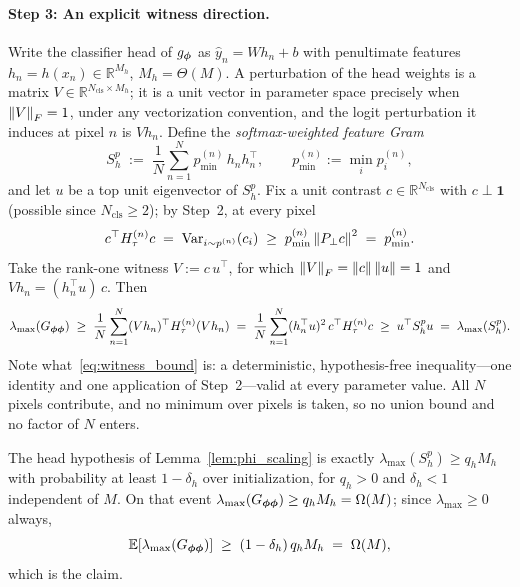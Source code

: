 \paragraph{Step 3: An explicit witness direction.}
Write the classifier head of $g_{\boldsymbol{\phi}}$ as $\hat{y}_n = W h_n + b$
with penultimate features $h_n = h(x_n) \in \mathbb{R}^{M_h}$,
$M_h = \Theta(M)$. A perturbation of the head weights is a matrix
$V \in \mathbb{R}^{N_{\mathrm{cls}} \times M_h}$; it is a unit vector in
parameter space precisely when $\left\lVert V\right\rVert_F = 1$, under any
vectorization convention, and the logit perturbation it induces at
pixel $n$ is $V h_n$. Define the \emph{softmax-weighted feature
Gram}
\begin{equation}
\label{eq:feature_gram}
    S_h^{p} \;:=\; \frac{1}{N} \sum_{n=1}^{N}
        p^{(n)}_{\min}\, h_n h_n^\top,
    \qquad
    p^{(n)}_{\min} := \min_i p^{(n)}_i ,
\end{equation}
and let $u$ be a top unit eigenvector of $S_h^{p}$. Fix a unit
contrast $c \in \mathbb{R}^{N_{\mathrm{cls}}}$ with $c \perp \mathbf{1}$
(possible since $N_{\mathrm{cls}} \geq 2$); by Step~2, at every pixel
\[
    c^\top H_\tau^{(n)} c
    \;=\; \mathrm{Var}_{i \sim p^{(n)}}(c_i)
    \;\geq\; p^{(n)}_{\min} \left\lVert P_\perp c\right\rVert^2
    \;=\; p^{(n)}_{\min}.
\]
Take the rank-one witness $V := c\, u^\top$, for which
$\left\lVert V\right\rVert_F = \left\lVert c\right\rVert\left\lVert u\right\rVert = 1$ and $V h_n = (h_n^\top u)\, c$.
Then
\begin{equation}
\label{eq:witness_bound}
    \lambda_{\max}(G_{{\boldsymbol{\phi}}{\boldsymbol{\phi}}})
    \;\geq\; \frac{1}{N} \sum_{n=1}^{N}
        (V h_n)^\top H_\tau^{(n)} (V h_n)
    \;=\; \frac{1}{N} \sum_{n=1}^{N}
        (h_n^\top u)^2\, c^\top H_\tau^{(n)} c
    \;\geq\; u^\top S_h^{p} u
    \;=\; \lambda_{\max}(S_h^{p}).
\end{equation}
Note what~\eqref{eq:witness_bound} is: a deterministic,
hypothesis-free inequality---one identity and one application of
Step~2---valid at every parameter value. All $N$ pixels contribute,
and no minimum over pixels is taken, so no union bound and no factor
of $N$ enters.

The head hypothesis of Lemma~\ref{lem:phi_scaling} is exactly
$\lambda_{\max}(S_h^{p}) \geq q_h M_h$ with probability at least
$1 - \delta_h$ over initialization, for $q_h > 0$ and
$\delta_h < 1$ independent of $M$. On that event
$\lambda_{\max}(G_{{\boldsymbol{\phi}}{\boldsymbol{\phi}}}) \geq q_h M_h = \Omega(M)$; since
$\lambda_{\max} \geq 0$ always,
\[
    \mathbb{E}\!\left[\lambda_{\max}(G_{{\boldsymbol{\phi}}{\boldsymbol{\phi}}})\right]
    \;\geq\; (1 - \delta_h)\, q_h M_h
    \;=\; \Omega(M),
\]
which is the claim.

